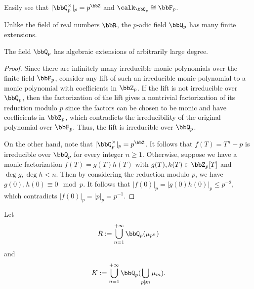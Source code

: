     Easily see that \(|\bbQ_p^\times|_p = p^\bbZ\) and \(\calk_{\bbQ_p} \cong \bbF_p\).

    Unlike the field of real numbers \(\bbR\), the \(p\)-adic field \(\bbQ_p\) has many finite extensions.

    \begin{proposition}\label{prop:irreducible_polynomial_over_Q_p}
        The field \(\bbQ_p\) has algebraic extensions of arbitrarily large degree.
    \end{proposition}
    \begin{proof}
        Since there are infinitely many irreducible monic polynomials over the finite field \(\bbF_p\), 
        consider any lift of such an irreducible monic polynomial to a monic polynomial with coefficients in \(\bbZ_p\).
        If the lift is not irreducible over \(\bbQ_p\), 
        then the factorization of the lift gives a nontrivial factorization of its reduction modulo \(p\) since the factors can be chosen to be monic and have coefficients in \(\bbZ_p\), 
        which contradicts the irreducibility of the original polynomial over \(\bbF_p\).
        Thus, the lift is irreducible over \(\bbQ_p\).

        On the other hand, note that \(|\bbQ_p^\times|_p = p^\bbZ\).
        It follows that \(f(T) = T^n - p\) is irreducible over \(\bbQ_p\) for every integer \(n \geq 1\).
        Otherwise, suppose we have a monic factorization \(f(T) = g(T) h(T)\) with \(g(T), h(T) \in \bbZ_p[T]\) and \(\deg g, \deg h < n\). 
        Then by considering the reduction modulo \(p\), we have \(g(0), h(0) \equiv 0 \mod p\).
        It follows that \(|f(0)|_p = |g(0) h(0)|_p \leq p^{-2}\), which contradicts \(|f(0)|_p = |p|_p = p^{-1}\).
    \end{proof}

    Let 
    \[ R := \bigcup_{n=1}^{+\infty} \bbQ_p(\mu_{p^n}) \]
    and 
    \[ K := \bigcup_{n=1}^{+\infty} \bbQ_p(\bigcup_{p\not\mid m} \mu_{m}). \]


